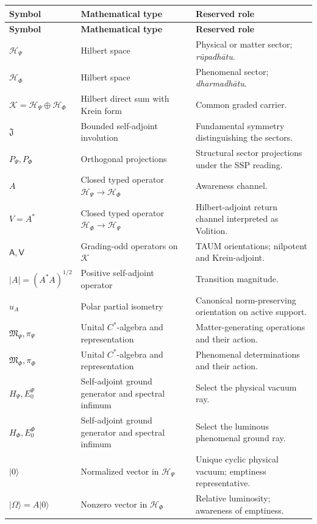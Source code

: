 \documentclass[11pt,reqno]{scrartcl}
\newcommand{\scrK}{\mathscr K}
\newcommand{\scrHP}{\mathscr H_{\Psi}}
\newcommand{\scrHF}{\mathscr H_{\Phi}}
\newcommand{\algP}{\mathfrak M_{\Psi}}
\newcommand{\algF}{\mathfrak M_{\Phi}}
\newcommand{\piP}{\pi_{\Psi}}
\newcommand{\piF}{\pi_{\Phi}}
\newcommand{\fundJ}{\mathfrak J}
\newcommand{\PP}{P_{\Psi}}
\newcommand{\PF}{P_{\Phi}}
\newcommand{\Aodd}{\mathsf A}
\newcommand{\Vodd}{\mathsf V}
\newcommand{\ket}[1]{\lvert #1\rangle}
\theoremstyle{plain}
\theoremstyle{definition}
\theoremstyle{remark}
\begin{document}
\begin{longtable}{>{\raggedright\arraybackslash}p{}
>{\raggedright\arraybackslash}p{}
>{\raggedright\arraybackslash}p{}}
\toprule
\textbf{Symbol} & \textbf{Mathematical type} & \textbf{Reserved role} \\
\midrule
\endfirsthead
\toprule
\textbf{Symbol} & \textbf{Mathematical type} & \textbf{Reserved role} \\
\midrule
\endhead
$\scrHP$ & Hilbert space & Physical or matter sector; \emph{r\=upadh\=atu}. \\
$\scrHF$ & Hilbert space & Phenomenal sector; \emph{dharmadh\=atu}. \\
$\scrK=\scrHP\oplus\scrHF$ & Hilbert direct sum with Krein form & Common graded carrier. \\
$\fundJ$ & Bounded self-adjoint involution & Fundamental symmetry distinguishing the sectors. \\
$\PP,\PF$ & Orthogonal projections & Structural sector projections under the SSP reading. \\
$A$ & Closed typed operator $\scrHP\to\scrHF$ & Awareness channel. \\
$V=A^*$ & Closed typed operator $\scrHF\to\scrHP$ & Hilbert-adjoint return channel interpreted as Volition. \\
$\Aodd,\Vodd$ & Grading-odd operators on $\scrK$ & TAUM orientations; nilpotent and Krein-adjoint. \\
$|A|=(A^*A)^{1/2}$ & Positive self-adjoint operator & Transition magnitude. \\
$u_A$ & Polar partial isometry & Canonical norm-preserving orientation on active support. \\
$\algP,\piP$ & Unital $C^*$-algebra and representation & Matter-generating operations and their action. \\
$\algF,\piF$ & Unital $C^*$-algebra and representation & Phenomenal determinations and their action. \\
$H_{\Psi},E_0^{\Psi}$ & Self-adjoint ground generator and spectral infimum & Select the physical vacuum ray. \\
$H_{\Phi},E_0^{\Phi}$ & Self-adjoint ground generator and spectral infimum & Select the luminous phenomenal ground ray. \\
$\ket0$ & Normalized vector in $\scrHP$ & Unique cyclic physical vacuum; emptiness representative. \\
$\ket\Omega=A\ket0$ & Nonzero vector in $\scrHF$ & Relative luminosity; awareness of emptiness. \\

\end{longtable}
\end{document}

